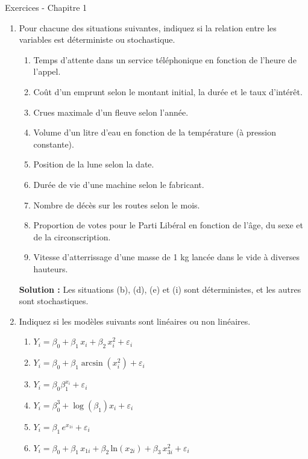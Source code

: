 \documentclass[letter, 11pt]{article}
\newcommand{\prof}[1]{\begin{professeur}\color{blue} {\bf Solution :} #1 \end{professeur}}
\begin{document}
\vspace*{0.01 cm}
\begin{center}
{\Large Exercices - Chapitre 1}
\end{center}



\begin{enumerate}[leftmargin=*, wide, label=\bf Exercice \arabic*:]

\item Pour chacune des situations suivantes, indiquez si la relation entre les variables est déterministe ou stochastique. 

\begin{enumerate}
  \item Temps d'attente dans un service  téléphonique en fonction de l'heure de l'appel.
	\item Coût d'un emprunt selon le montant initial, la durée et le taux d'intérêt.
	\item Crues maximale d'un fleuve selon l'année.
	\item Volume d'un litre d'eau en fonction de la température (à pression constante).
	\item Position de la lune selon la date.
  \item Durée de vie d'une machine selon le fabricant.
  \item Nombre de décès sur les routes selon le mois.
  \item Proportion de votes pour le Parti Libéral en fonction de l'âge, du sexe et de la circonscription.
	\item Vitesse d'atterrissage d'une masse de 1 kg lancée dans le vide à diverses hauteurs.
  \end{enumerate}

\prof{Les situations (b), (d), (e) et (i) sont déterministes, et les autres sont stochastiques.}

\vspace{0.1 in}
\item
Indiquez si les modèles suivants  sont linéaires ou non linéaires.

\begin{enumerate}
\item $Y_i=\beta_0+\beta_1\,x_i+\beta_2\,x_i^2+\varepsilon_i$
\item $Y_i=\beta_0+\beta_1\arcsin(x_i^2)+\varepsilon_i$
\item $Y_i=\beta_0\beta_1^{x_i}+\varepsilon_i$
\item $Y_i=\beta_0^3+\log(\beta_1)x_i+\varepsilon_i$
\item $Y_i = \beta_1\,e^{x_{1i}}+\varepsilon_i$
\item $Y_i=\beta_0 + \beta_1\,x_{1i}+ \beta_2\,\text{ln}(x_{2i})+ \beta_3\,x_{3i}^2+ \varepsilon_i$
\end{enumerate}


\end{enumerate}
\end{document}
